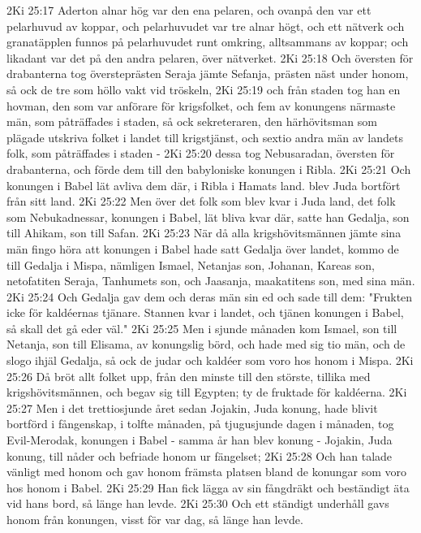 2Ki 25:17  Aderton alnar hög var den ena pelaren, och ovanpå den var ett pelarhuvud av koppar, och pelarhuvudet var tre alnar högt, och ett nätverk och granatäpplen funnos på pelarhuvudet runt omkring, alltsammans av koppar; och likadant var det på den andra pelaren, över nätverket.
2Ki 25:18  Och översten för drabanterna tog översteprästen Seraja jämte Sefanja, prästen näst under honom, så ock de tre som höllo vakt vid tröskeln,
2Ki 25:19  och från staden tog han en hovman, den som var anförare för krigsfolket, och fem av konungens närmaste män, som påträffades i staden, så ock sekreteraren, den härhövitsman som plägade utskriva folket i landet till krigstjänst, och sextio andra män av landets folk, som påträffades i staden -
2Ki 25:20  dessa tog Nebusaradan, översten för drabanterna, och förde dem till den babyloniske konungen i Ribla.
2Ki 25:21  Och konungen i Babel lät avliva dem där, i Ribla i Hamats land. blev Juda bortfört från sitt land.
2Ki 25:22  Men över det folk som blev kvar i Juda land, det folk som Nebukadnessar, konungen i Babel, lät bliva kvar där, satte han Gedalja, son till Ahikam, son till Safan.
2Ki 25:23  När då alla krigshövitsmännen jämte sina män fingo höra att konungen i Babel hade satt Gedalja över landet, kommo de till Gedalja i Mispa, nämligen Ismael, Netanjas son, Johanan, Kareas son, netofatiten Seraja, Tanhumets son, och Jaasanja, maakatitens son, med sina män.
2Ki 25:24  Och Gedalja gav dem och deras män sin ed och sade till dem: "Frukten icke för kaldéernas tjänare. Stannen kvar i landet, och tjänen konungen i Babel, så skall det gå eder väl."
2Ki 25:25  Men i sjunde månaden kom Ismael, son till Netanja, son till Elisama, av konungslig börd, och hade med sig tio män, och de slogo ihjäl Gedalja, så ock de judar och kaldéer som voro hos honom i Mispa.
2Ki 25:26  Då bröt allt folket upp, från den minste till den störste, tillika med krigshövitsmännen, och begav sig till Egypten; ty de fruktade för kaldéerna.
2Ki 25:27  Men i det trettiosjunde året sedan Jojakin, Juda konung, hade blivit bortförd i fångenskap, i tolfte månaden, på tjugusjunde dagen i månaden, tog Evil-Merodak, konungen i Babel - samma år han blev konung - Jojakin, Juda konung, till nåder och befriade honom ur fängelset;
2Ki 25:28  Och han talade vänligt med honom och gav honom främsta platsen bland de konungar som voro hos honom i Babel.
2Ki 25:29  Han fick lägga av sin fångdräkt och beständigt äta vid hans bord, så länge han levde.
2Ki 25:30  Och ett ständigt underhåll gavs honom från konungen, visst för var dag, så länge han levde.


